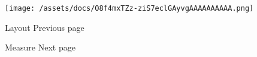 \texttt{[image: /assets/docs/O8f4mxTZz-ziS7eclGAyvgAAAAAAAAAA.png]}

\href{/docs/reference/layout/layout/}{\pandocbounded{}}

{ Layout } { Previous page }

\href{/docs/reference/layout/measure/}{\pandocbounded{}}

{ Measure } { Next page }
